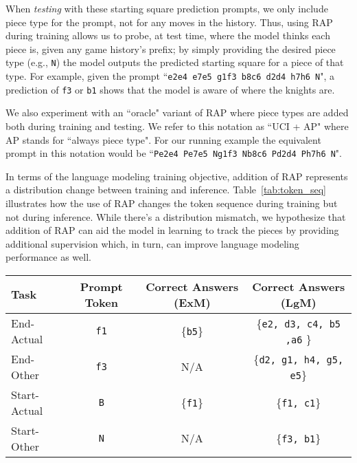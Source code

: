 \documentclass[12pt]{thesis-umich}[thesis]
\newcommand{\pos}[1]{\texttt{#1}}
\newcommand{\legalmove}{LgM\xspace}
\newcommand{\exactmove}{ExM\xspace}
\newcommand{\piecetype}{AP\xspace}
\begin{document}
When \emph{testing} with these starting square prediction prompts, we only include piece type for the prompt, not for any moves in the history.
Thus, using RAP during training allows us to probe, at test time, where the model thinks each piece is, given any game history's prefix; by simply providing the desired piece type (e.g., \pos{N}) the model outputs the predicted starting square for a piece of that type.
For example, given the prompt ``\pos{e2e4 e7e5 g1f3 b8c6 d2d4 h7h6 N}", a prediction of \pos{f3} or \pos{b1} shows that the model is aware of where the knights are.

We also experiment with an ``oracle" variant of RAP where piece types are added both during training and testing. We refer to this notation as ``UCI + \piecetype" where AP stands for ``always piece type".
For our running example the equivalent prompt in this notation would be ``\pos{Pe2e4 Pe7e5 Ng1f3 Nb8c6 Pd2d4 Ph7h6 N}".

In terms of the language modeling training objective, addition of RAP represents a distribution change between training and inference.
Table~\ref{tab:token_seq} illustrates how the use of RAP changes the token sequence during training but not during inference.  
While there's a distribution mismatch, we hypothesize that addition of RAP can aid the model in learning to track the pieces by providing additional supervision which, in turn, can improve language modeling performance as well.  





\begin{table*}[t]
\centering
\begin{tabular}{lccc}
\toprule
Task & Prompt Token & Correct Answers (\exactmove) & Correct Answers (\legalmove) \\
\midrule
 End-Actual & \pos{f1} & \{\pos{b5}\} & \{\pos{e2, d3, c4, b5 ,a6} \} \\
End-Other & \pos{f3} & N/A & \{\pos{d2, g1, h4, g5, e5}\} \\
  \midrule
Start-Actual & \pos{B} & \{\pos{f1}\} & \{\pos{f1, c1}\} \\
Start-Other & \pos{N} & N/A & \{\pos{f3, b1}\} \\
\bottomrule
\end{tabular}
\caption{Examples of each probing task, as well as the corresponding exact move (\exactmove) and legal move (\legalmove) correct answers, are shown below. All examples assume the language model was fed the prefix \pos{e2e4 e7e5 g1f3 b8c6 d2d4 h7h6} (see Figure~\ref{fig:move_notation}), and that the actual next move was \pos{f1b5}. While there is only one valid prompt token for both End-Actual and Start-Actual tasks, there are many valid prompt tokens for the other tasks, and we show just one possibility for each. Start-tasks (bottom sub-table) assume the model was trained on games described in UCI+RAP notation.}
\label{tab:tasks}

\end{table*}
\end{document}
